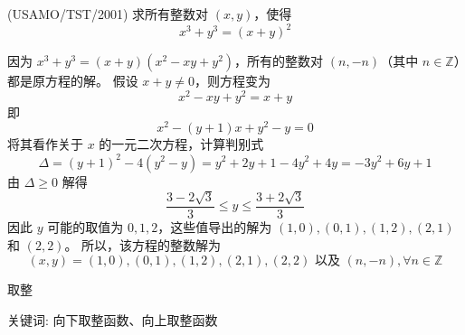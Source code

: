 \begin{questions}

\question (USAMO/TST/2001) 求所有整数对 $(x, y)$，使得
\[
x^3 + y^3 = (x + y)^2
\]

\begin{solution}
因为 $x^3 + y^3 = (x + y)(x^2 - xy + y^2)$，所有的整数对 $(n, -n)$（其中 $n \in \mathbb{Z}$）都是原方程的解。
假设 $x + y \neq 0$，则方程变为
\[
x^2 - xy + y^2 = x + y
\]
即
\[
x^2 - (y + 1)x + y^2 - y = 0
\]
将其看作关于 $x$ 的一元二次方程，计算判别式
\[
\Delta = (y + 1)^2 - 4(y^2 - y) = y^2 + 2y + 1 - 4y^2 + 4y = -3y^2 + 6y + 1
\]
由 $\Delta \ge 0$ 解得
\[
\frac{3 - 2\sqrt{3}}{3} \le y \le \frac{3 + 2\sqrt{3}}{3}
\]
因此 $y$ 可能的取值为 $0, 1, 2$，这些值导出的解为 $(1, 0), (0, 1), (1, 2), (2, 1)$ 和 $(2, 2)$。
所以，该方程的整数解为
\[
(x, y) = (1, 0), (0, 1), (1, 2), (2, 1), (2, 2) \text{ 以及 } (n, -n), \forall n \in \mathbb{Z}
\]
\end{solution}
\end{questions}
\pagebreak
\begin{center}
  {\fontsize{30pt}{26pt}\selectfont
    \hypertarget{取整}{取整} \label{取整}
  }
\end{center}
\separator
\begin{center}
    关键词: 向下取整函数、向上取整函数
\end{center}
\vspace{0.5pt}

